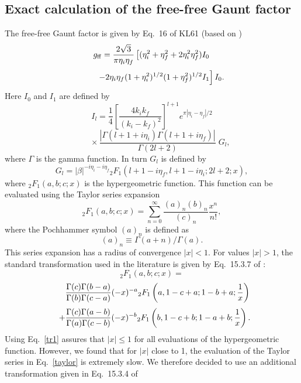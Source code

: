 \documentclass[useAMS,usenatbib]{mn2e}
\begin{document}
\subsection{Exact calculation of the free-free Gaunt factor}

The free-free Gaunt factor is given by Eq.~16 of KL61 (based on \citealp{Bi56})
\[ g_{\rm ff} = \frac{2\sqrt{3}}{\pi \eta_i\eta_f} \left[ (\eta_i^2+\eta_f^2 + 2\eta_i^2\eta_f^2) I_0 \right. \]
\begin{equation}
\label{gff}
\phantom{g_{\rm ff} =} \left. - 2\eta_i\eta_f (1+\eta_i^2)^{1/2} (1+\eta_f^2)^{1/2} I_1 \right] I_0.
\end{equation}
Here $I_0$ and $I_1$ are defined by
\[ I_l = \frac{1}{4} \left[ \frac{4k_ik_f}{(k_i-k_f)^2} \right]^{l+1} e^{\pi | \eta_i-\eta_f |/2} \]
\begin{equation}
\phantom{I_l =} \times \frac{| \Gamma(l+1+i\eta_i) \Gamma(l+1+i\eta_f) |}{\Gamma(2l+2)} \; G_l,
\end{equation}
where $\Gamma$ is the gamma function. In turn $G_l$ is defined by
\begin{equation}
\label{Gl}
G_l = | \beta |^{-i\eta_i-i\eta_f} {}_2F_1( l+1-i\eta_f, l+1-i\eta_i; 2l+2; x ),
\end{equation}
where ${}_2F_1(a,b;c;x)$ is the hypergeometric function. This function
can be evaluated using the Taylor series expansion
\begin{equation}
\label{taylor}
{}_2F_1(a,b;c;x) = \sum_{n=0}^{\infty} \frac{(a)_n(b)_n}{(c)_n}\frac{x^n}{n!},
\end{equation}
where the Pochhammer symbol $(a)_n$ is defined as
\[ (a)_n \equiv \Gamma(a+n)/\Gamma(a). \]
This series expansion has a radius of convergence $|x| < 1$. For values $|x| >
1$, the standard transformation used in the literature is given by Eq.~15.3.7
of \citet{AS72}:
\[ {}_2F_1(a,b;c;x) = \]
\[ \hspace{5mm} \frac{\Gamma(c)\Gamma(b-a)}{\Gamma(b)\Gamma(c-a)} (-x)^{-a} {}_2F_1\left(a,1-c+a;1-b+a;\frac{1}{x}\right) \]
\begin{equation}
\label{tr1}
\hspace{2.5mm} + \frac{\Gamma(c)\Gamma(a-b)}{\Gamma(a)\Gamma(c-b)} (-x)^{-b} {}_2F_1\left(b,1-c+b;1-a+b;\frac{1}{x}\right).
\end{equation}
Using Eq.~\ref{tr1} assures that $|x| \leq 1$ for all evaluations of the
hypergeometric function. However, we found that for $|x|$ close to 1, the
evaluation of the Taylor series in Eq.~\ref{taylor} is extremely slow. We
therefore decided to use an additional transformation given in Eq.~15.3.4 of
\end{document}
